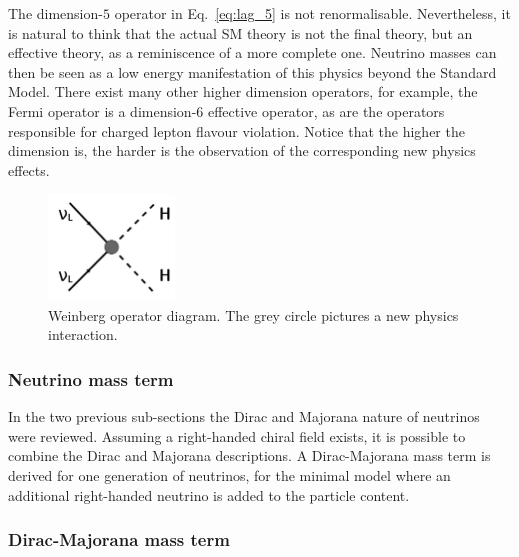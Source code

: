 The dimension-$5$ operator in Eq.~\eqref{eq:lag_5} is not renormalisable.
Nevertheless, it is natural to think that the actual SM theory is not the final theory, but an effective theory, as a reminiscence of a more complete one.
Neutrino masses can then be seen as a low energy manifestation of this physics beyond the Standard Model.
There exist many other higher dimension operators, for example, the Fermi operator is a dimension-6 effective operator, as are the operators responsible for charged lepton flavour violation.
Notice that the higher the dimension is, the harder is the observation of the corresponding new physics effects.
\begin{figure}[h!]
  \centering
  \includegraphics[width=0.3\textwidth]{neutrinophysics/fig_neutrinophysics/Weinberg_diagram.pdf}
  \caption{Weinberg operator diagram.
    The grey circle pictures a new physics interaction.
    \label{fig:weinberg_diagram}}
\end{figure}


\subsubsection{Neutrino mass term}

In the two previous sub-sections the Dirac and Majorana nature of neutrinos were reviewed.
Assuming a right-handed chiral field exists, it is possible to combine the Dirac and Majorana descriptions.
A Dirac-Majorana mass term is derived for one generation of neutrinos, for the minimal model where an additional right-handed neutrino is added to the particle content.


\subsubsection*{Dirac-Majorana mass term}

